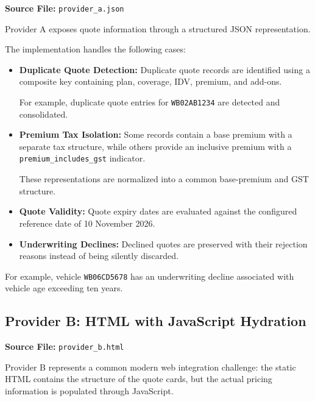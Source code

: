 \documentclass[11pt,a4paper]{article}
\begin{document}
\textbf{Source File:} \texttt{provider\_a.json}

Provider A exposes quote information through a structured JSON
representation.

The implementation handles the following cases:

\begin{itemize}

    \item \textbf{Duplicate Quote Detection:}
    Duplicate quote records are identified using a composite
    key containing plan, coverage, IDV, premium, and add-ons.

    For example, duplicate quote entries for
    \texttt{WB02AB1234} are detected and consolidated.

    \item \textbf{Premium Tax Isolation:}
    Some records contain a base premium with a separate tax structure,
    while others provide an inclusive premium with a
    \texttt{premium\_includes\_gst} indicator.

    These representations are normalized into a common
    base-premium and GST structure.

    \item \textbf{Quote Validity:}
    Quote expiry dates are evaluated against the configured
    reference date of 10 November 2026.

    \item \textbf{Underwriting Declines:}
    Declined quotes are preserved with their rejection reasons
    instead of being silently discarded.

\end{itemize}

For example, vehicle \texttt{WB06CD5678} has an underwriting
decline associated with vehicle age exceeding ten years.


\subsection{Provider B: HTML with JavaScript Hydration}

\textbf{Source File:} \texttt{provider\_b.html}

Provider B represents a common modern web integration challenge:
the static HTML contains the structure of the quote cards, but
the actual pricing information is populated through JavaScript.
\end{document}
